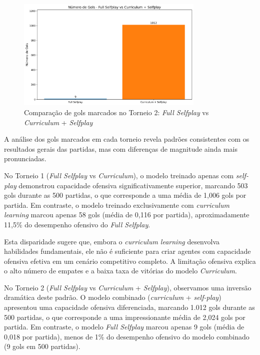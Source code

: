\begin{figure}[H]
    \centering
    \includegraphics[width=0.8\textwidth]{fig/graficos_trabalho/graficos_torneios/torneios/gols_full_selfplay_vs_curriculum_+_selfplay.png}
    \caption{Comparação de gols marcados no Torneio 2: \textit{Full Selfplay} vs \textit{Curriculum} + \textit{Selfplay}}
    \label{fig:gols_torneio2}
\end{figure}

A análise dos gols marcados em cada torneio revela padrões consistentes com os resultados gerais das partidas, mas com diferenças de magnitude ainda mais pronunciadas.

No Torneio 1 (\textit{Full Selfplay} vs \textit{Curriculum}), o modelo treinado apenas com \textit{self-play} demonstrou capacidade ofensiva significativamente superior, marcando 503 gols durante as 500 partidas, o que corresponde a uma média de 1,006 gols por partida. Em contraste, o modelo treinado exclusivamente com \textit{curriculum learning} marcou apenas 58 gols (média de 0,116 por partida), aproximadamente 11,5\% do desempenho ofensivo do \textit{Full Selfplay}.

Esta disparidade sugere que, embora o \textit{curriculum learning} desenvolva habilidades fundamentais, ele não é suficiente para criar agentes com capacidade ofensiva efetiva em um cenário competitivo completo. A limitação ofensiva explica o alto número de empates e a baixa taxa de vitórias do modelo \textit{Curriculum}.

No Torneio 2 (\textit{Full Selfplay} vs \textit{Curriculum} + \textit{Selfplay}), observamos uma inversão dramática deste padrão. O modelo combinado (\textit{curriculum} + \textit{self-play}) apresentou uma capacidade ofensiva diferenciada, marcando 1.012 gols durante as 500 partidas, o que corresponde a uma impressionante média de 2,024 gols por partida. Em contraste, o modelo \textit{Full Selfplay} marcou apenas 9 gols (média de 0,018 por partida), menos de 1\% do desempenho ofensivo do modelo combinado (9 gols em 500 partidas).

